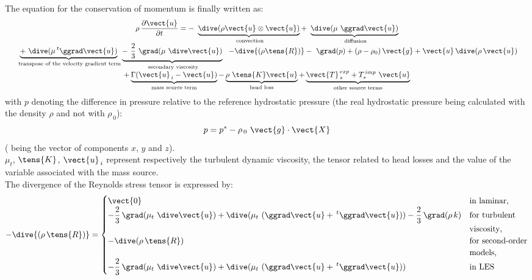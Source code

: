 The equation for the conservation of momentum is finally written as:
\begin{equation}
\begin{array}{lcl}
&\displaystyle \rho\,
\frac{\partial \vect {u} } {\partial t} = -\
\underbrace {\dive(\rho \vect{u} \otimes \vect{u})}_{\text{
convection}} +\ \underbrace {\dive (\mu\ \ggrad \vect {u})}_{\text{
diffusion}} &\\
&\displaystyle \underbrace { +\ \dive (\mu \,^t\ggrad \vect {u}) }_{\text{
transpose of the velocity gradient term}}
\underbrace { - \ \frac {2} {3}\ \grad (\mu\ \dive \vect {u})}_{\text{
secondary viscosity}}\ \ - \dive{(\rho \tens{R})}
 -\ \grad(p) + (\rho -\rho_0)\,\vect {g} +
\vect{u}\,\dive (\rho\,\vect {u})&\\
&\displaystyle +\underbrace {\Gamma
(\vect{u}_{\,i}-\vect{u})}_{\text{mass source term}}-
\underbrace {\rho\
\tens{K} \vect {u}}_{\text{head loss}} +
\underbrace { \vect{T}_{\,s}^{\,exp}+
T_{s}^{\,imp}\ \vect{u}}_{\text{other source terms}}
\label{Base_Predvv_eqqdm}

\end{array}
\end{equation}
with $p$ denoting the difference in pressure relative to the reference hydrostatic
pressure (the real hydrostatic pressure being calculated with the density
$\rho$ and not with $\rho_{\,0}$):
\begin{equation}
p=p^*-\rho_{\,0}\ \vect{g}\cdot{}
\end{equation}
(\vect{X} being the vector of components $x$, $y$ and $z$).\\
$\mu_t$, $\tens{K}$, $\vect{u}_{\,i}$ represent respectively
the turbulent dynamic viscosity, the tensor related to head losses and the value of the
variable associated with the mass source.\\
The divergence of the Reynolds stress tensor is expressed by:
\begin{equation}
-\dive{(\rho\,\tens{R})}=
\begin{cases}
\vect{0} & \text{in laminar}, \\
 -\displaystyle\frac {2} {3}\, \grad (\mu_t\ \dive \vect {u})+\dive (\mu_t\ (\ggrad \vect {u}+ \,^t\ggrad \vect {u}))-\frac {2}{3}\,\grad (\rho\, k) & \text{for turbulent}\\
 & \text{viscosity}, \\
 -\dive(\rho\,\tens{R})& \text{for second-order}\\
 & \text{models},\\
-\displaystyle\frac {2} {3}\, \grad (\mu_t\ \dive \vect {u})+\dive (\mu_t\ (\ggrad \vect {u}+ \,^t\ggrad \vect {u})) & \text{in  LES}\\
\end{cases}
\end{equation}
